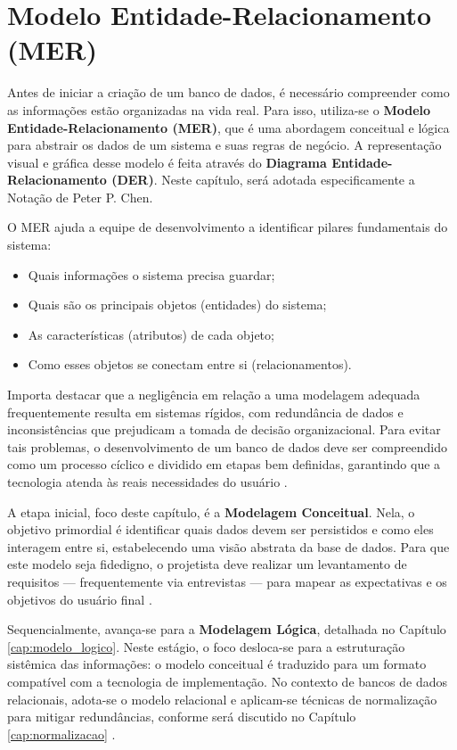 \chapter{Modelo Entidade-Relacionamento (MER)}

Antes de iniciar a criação de um banco de dados, é necessário compreender como as informações estão organizadas na vida real. Para isso, utiliza-se o \textbf{Modelo Entidade-Relacionamento (MER)}, que é uma abordagem conceitual e lógica para abstrair os dados de um sistema e suas regras de negócio. A representação visual e gráfica desse modelo é feita através do \textbf{Diagrama Entidade-Relacionamento (DER)}. Neste capítulo, será adotada especificamente a Notação de Peter P. Chen.

O MER ajuda a equipe de desenvolvimento a identificar pilares fundamentais do sistema:
\begin{itemize}
    \item Quais informações o sistema precisa guardar;
    \item Quais são os principais objetos (entidades) do sistema;
    \item As características (atributos) de cada objeto;
    \item Como esses objetos se conectam entre si (relacionamentos).
\end{itemize}

Importa destacar que a negligência em relação a uma modelagem adequada frequentemente resulta em sistemas rígidos, com redundância de dados e inconsistências que prejudicam a tomada de decisão organizacional. Para evitar tais problemas, o desenvolvimento de um banco de dados deve ser compreendido como um processo cíclico e dividido em etapas bem definidas, garantindo que a tecnologia atenda às reais necessidades do usuário \cite{angelotti2010banco}.

A etapa inicial, foco deste capítulo, é a \textbf{Modelagem Conceitual}. Nela, o objetivo primordial é identificar quais dados devem ser persistidos e como eles interagem entre si, estabelecendo uma visão abstrata da base de dados. Para que este modelo seja fidedigno, o projetista deve realizar um levantamento de requisitos — frequentemente via entrevistas — para mapear as expectativas e os objetivos do usuário final \cite{angelotti2010banco}.

Sequencialmente, avança-se para a \textbf{Modelagem Lógica}, detalhada no Capítulo \ref{cap:modelo_logico}. Neste estágio, o foco desloca-se para a estruturação sistêmica das informações: o modelo conceitual é traduzido para um formato compatível com a tecnologia de implementação. No contexto de bancos de dados relacionais, adota-se o modelo relacional e aplicam-se técnicas de normalização para mitigar redundâncias, conforme será discutido no Capítulo \ref{cap:normalizacao} \cite{angelotti2010banco}.


